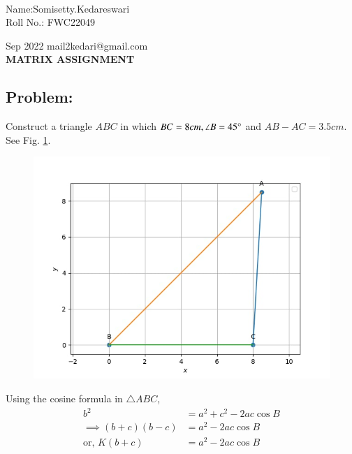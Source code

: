 \documentclass[10pt,a4paper]{report}
\begin{document}
 \vspace{3mm}\\ \raggedleft Name:Somisetty.Kedareswari\vspace{2mm}\\ \raggedleft Roll No.: FWC22049\vspace{2mm}\\ \raggedright Sep 2022 \hspace{12cm} \raggedleft mail2kedari@gmail.com \vspace{10mm}
\\ \centering \Large \textbf{MATRIX ASSIGNMENT} \normalsize \vspace{15mm}
\begin{multicols}{2}
\section{Problem:}  
\fi
	Construct a triangle $ABC$ in which $BC=8cm, \angle{B}=45\degree$ and $AB - AC = 3.5 cm$.
	\solution 
	See Fig. 
		\ref{fig:9/11/2/2}.
	\begin{figure}[!h]
		\centering
 \includegraphics[width=\columnwidth]{chapters/9/11/2/2/figs/Fig.png}
		\caption{}
		\label{fig:9/11/2/2}
  	\end{figure}
	Using the cosine formula in  $\triangle ABC$,
\begin{align}
	{b}^2&= {a}^2 + {c}^2 - 2ac\cos{B}
\\
\implies	(b+c)(b-c) &= {a}^2- 2  a  c\cos{B}
\\
	\text{or, }K(b+c) &= {a}^2- 2  a  c\cos{B}
		\label{fig:9/11/2/2/k}
\end{align}

\end{multicols}
\end{document}
